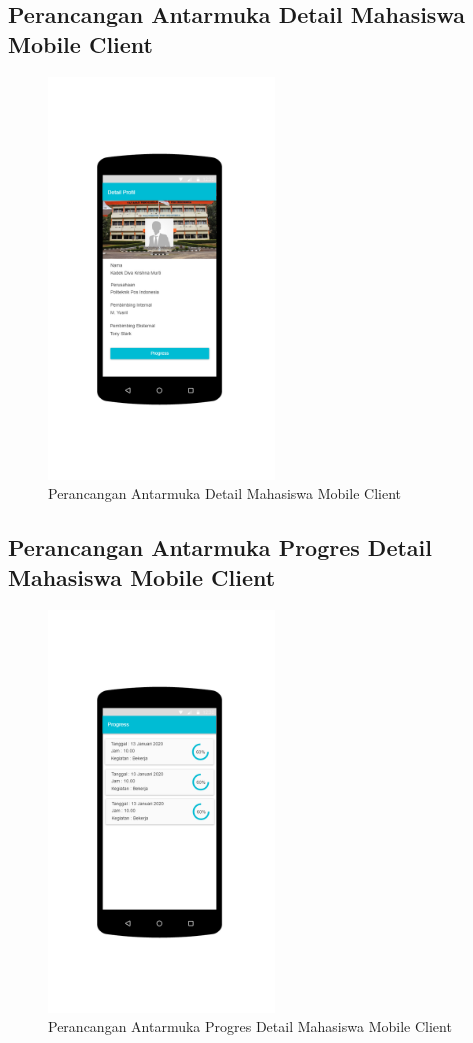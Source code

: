 \subsection{Perancangan Antarmuka Detail Mahasiswa Mobile Client }
	\begin{figure}[H]
		\includegraphics[width=6cm]{figures/diagram/image130.png}
		\centering
		\caption{Perancangan Antarmuka Detail Mahasiswa Mobile Client}
	\end{figure}
\subsection{Perancangan Antarmuka Progres Detail Mahasiswa Mobile Client }
	\begin{figure}[H]
		\includegraphics[width=6cm]{figures/diagram/image131.png}
		\centering
		\caption{Perancangan Antarmuka Progres Detail Mahasiswa Mobile Client}
	\end{figure}
